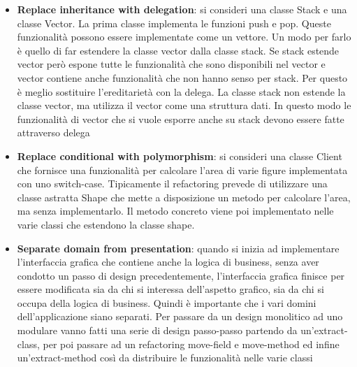 \begin{itemize}[noitemsep]
    \item \textbf{Replace inheritance with delegation}: si consideri una classe Stack e una classe Vector. La prima classe implementa le funzioni push e pop. Queste funzionalità possono essere implementate come un vettore. Un modo per farlo è quello di far estendere la classe vector dalla classe stack. Se stack estende vector però espone tutte le funzionalità che sono disponibili nel vector e vector contiene anche funzionalità che non hanno senso per stack. Per questo è meglio sostituire l'ereditarietà con la delega. La classe stack non estende la classe vector, ma utilizza il vector come una struttura dati. In questo modo le funzionalità di vector che si vuole esporre anche su stack devono essere fatte attraverso delega
    \item \textbf{Replace conditional with polymorphism}: si consideri una classe Client che fornisce una funzionalità per calcolare l'area di varie figure implementata con uno switch-case. Tipicamente il refactoring prevede di utilizzare una classe astratta Shape che mette a disposizione un metodo per calcolare l'area, ma senza implementarlo. Il metodo concreto viene poi implementato nelle varie classi che estendono la classe shape.
    \item \textbf{Separate domain from presentation}: quando si inizia ad implementare l'interfaccia grafica che contiene anche la logica di business, senza aver condotto un passo di design precedentemente, l'interfaccia grafica finisce per essere modificata sia da chi si interessa dell'aspetto grafico, sia da chi si occupa della logica di business. Quindi è importante che i vari domini dell'applicazione siano separati. Per passare da un design monolitico ad uno modulare vanno fatti una serie di design passo-passo partendo da un'extract-class, per poi passare ad un refactoring move-field e move-method ed infine un'extract-method così da distribuire le funzionalità nelle varie classi
\end{itemize}
